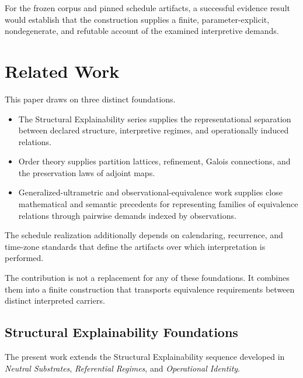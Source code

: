 \documentclass[11pt]{article}
\theoremstyle{plain}
\theoremstyle{definition}
\theoremstyle{remark}
\begin{document}
For the frozen corpus and pinned schedule artifacts,
a successful evidence result would establish
that the construction supplies a finite,
parameter-explicit, nondegenerate, and refutable account
of the examined interpretive demands.


\section{Related Work}
\label{ik.sec.related}

This paper draws on three distinct foundations.

\begin{itemize}
  \item The Structural Explainability series supplies
        the representational separation
        between declared structure,
        interpretive regimes,
        and operationally induced relations.

  \item Order theory supplies
        partition lattices,
        refinement,
        Galois connections,
        and the preservation laws of adjoint maps.

  \item Generalized-ultrametric and observational-equivalence work supplies
        close mathematical and semantic precedents
        for representing families of equivalence relations
        through pairwise demands indexed by observations.
\end{itemize}

The schedule realization additionally depends
on calendaring,
recurrence,
and time-zone standards
that define the artifacts
over which interpretation is performed.

The contribution is not a replacement
for any of these foundations.
It combines them into a finite construction
that transports equivalence requirements
between distinct interpreted carriers.

\subsection{Structural Explainability Foundations}

The present work extends the Structural Explainability sequence
developed in \emph{Neutral Substrates}, \emph{Referential Regimes}, and
\emph{Operational Identity}.
\end{document}
